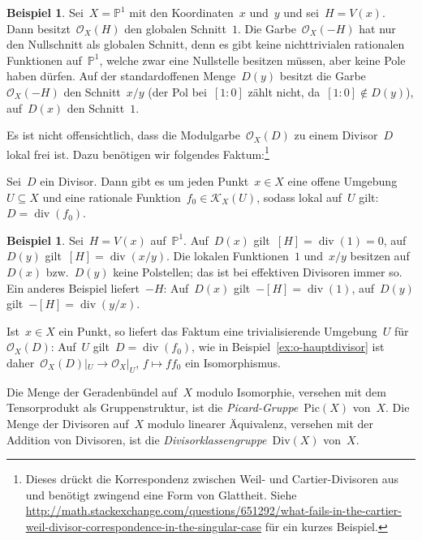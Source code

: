 \documentclass[a4paper,ngerman,12pt]{scrartcl}
\theoremstyle{definition}
\newtheorem{ex}[defn]{Beispiel}
\theoremstyle{plain}
\theoremstyle{remark}
\newcommand{\PP}{\mathbb{P}}
\newcommand{\K}{\mathcal{K}}
\renewcommand{\O}{\mathcal{O}}
\newcommand{\Pic}{\mathrm{Pic}}
\renewcommand{\div}{\operatorname{div}}
\newcommand{\Div}{\mathrm{Div}}
\begin{document}
\begin{ex}Sei~$X = \PP^1$ mit den Koordinaten~$x$ und~$y$ und sei~$H = V(x)$.
Dann besitzt~$\O_X(H)$ den globalen Schnitt~$1$. Die Garbe~$\O_X(-H)$ hat nur den
Nullschnitt als globalen Schnitt, denn es gibt keine nichttrivialen rationalen
Funktionen auf~$\PP^1$, welche zwar eine Nullstelle besitzen müssen, aber keine
Pole haben dürfen. Auf der standardoffenen Menge~$D(y)$ besitzt die Garbe~$\O_X(-H)$
den Schnitt~$x/y$ (der Pol bei~$[1:0]$ zählt nicht, da~$[1:0] \not\in D(y)$),
auf~$D(x)$ den Schnitt~$1$.
\end{ex}

Es ist nicht offensichtlich, dass die Modulgarbe~$\O_X(D)$ zu einem Divisor~$D$ lokal
frei ist. Dazu benötigen wir folgendes Faktum:\footnote{Dieses drückt die
Korrespondenz zwischen Weil- und Cartier-Divisoren aus und benötigt zwingend
eine Form von Glattheit. Siehe
\url{http://math.stackexchange.com/questions/651292/what-fails-in-the-cartier-weil-divisor-correspondence-in-the-singular-case}
für ein kurzes Beispiel.}

\begin{fact}Sei~$D$ ein Divisor. Dann gibt es um jeden Punkt~$x \in X$ eine
offene Umgebung~$U \subseteq X$ und eine rationale Funktion~$f_0 \in \K_X(U)$,
sodass lokal auf~$U$ gilt:~$D = \div(f_0)$.
\end{fact}

\begin{ex}Sei~$H = V(x)$ auf~$\PP^1$. Auf~$D(x)$ gilt~$[H] = \div(1) = 0$,
auf~$D(y)$ gilt~$[H] = \div(x/y)$. Die lokalen Funktionen~$1$ und~$x/y$
besitzen auf~$D(x)$ bzw.~$D(y)$ keine Polstellen; das ist bei effektiven
Divisoren immer so. Ein anderes Beispiel liefert~$-H$: Auf~$D(x)$ gilt~$-[H] =
\div(1)$, auf~$D(y)$ gilt~$-[H] = \div(y/x)$.\end{ex}

Ist~$x \in X$ ein Punkt, so liefert das Faktum eine trivialisierende
Umgebung~$U$ für~$\O_X(D)$: Auf~$U$ gilt~$D = \div(f_0)$, wie in
Beispiel~\ref{ex:o-hauptdivisor} ist daher~$\O_X(D)|_U \to \O_X|_U$, $f \mapsto
f f_0$ ein Isomorphismus.

\begin{defn}Die Menge der Geradenbündel
auf~$X$ modulo Isomorphie, versehen mit dem Tensorprodukt als Gruppenstruktur,
ist die \emph{Picard-Gruppe}~$\Pic(X)$ von~$X$. Die Menge der Divisoren auf~$X$
modulo linearer Äquivalenz, versehen mit der Addition von Divisoren, ist die
\emph{Divisorklassengruppe}~$\Div(X)$ von~$X$.
\end{defn}
\end{document}
